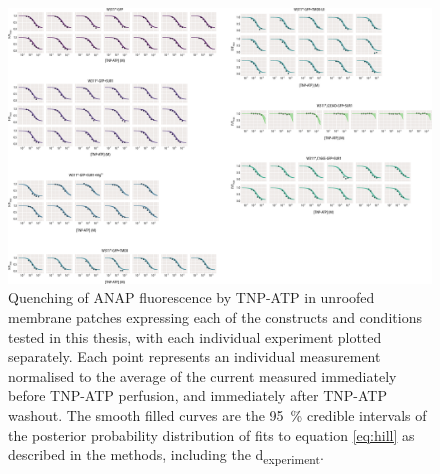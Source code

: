 \begin{figure}[h]
	\centering
	\includegraphics[width=\textwidth]{all_unroofed_fits_2.pdf}
	\caption[Unroofed membrane quenching sample hill fits]{
	{\bf{}}
	Quenching of ANAP fluorescence by TNP-ATP in unroofed membrane patches expressing each of the constructs and conditions tested in this thesis, with each individual experiment plotted separately.
	Each point represents an individual measurement normalised to the average of the current measured immediately before TNP-ATP perfusion, and immediately after TNP-ATP washout.
	The smooth filled curves are the \SI{95}{\percent} credible intervals of the posterior probability distribution of fits to equation \ref{eq:hill} as described in the methods, including the \textgreek{d}\textsubscript{experiment}.
	}
	\label{apxfig:unroofed_2}
\end{figure}

